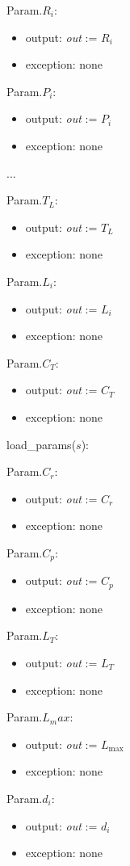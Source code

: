 \documentclass[12pt, titlepage]{article}
\begin{document}
\noindent Param.$R_i$:
\begin{itemize}
\item output: \textit{out} := $R_i$
\item exception: none
\end{itemize}

\noindent Param.$P_i$:
\begin{itemize}
\item output: \textit{out} := $P_i$
\item exception: none
\end{itemize}

...
~\newline

\noindent Param.$T_L$:
\begin{itemize}
\item output: \textit{out} := $T_L$
\item exception: none
\end{itemize}

\noindent Param.$L_i$:
\begin{itemize}
\item output: \textit{out} := $L_i$
\item exception: none
\end{itemize}
\noindent Param.$C_T$:
\begin{itemize}
\item output: \textit{out} := $C_T$
\item exception: none
\end{itemize}
\noindent load\_params($s$):

\noindent Param.$C_r$:
\begin{itemize}
\item output: \textit{out} := $C_r$
\item exception: none
\end{itemize}
\noindent Param.$C_p$:
\begin{itemize}
\item output: \textit{out} := $C_p$
\item exception: none
\end{itemize}
\noindent Param.$L_T$:
\begin{itemize}
\item output: \textit{out} := $L_T$
\item exception: none
\end{itemize}
\noindent Param.$L_max$:
\begin{itemize}
\item output: \textit{out} := $L_\text{max}$
\item exception: none
\end{itemize}
\noindent Param.$d_i$:
\begin{itemize}
\item output: \textit{out} := $d_i$
\item exception: none
\end{itemize}
\end{document}
